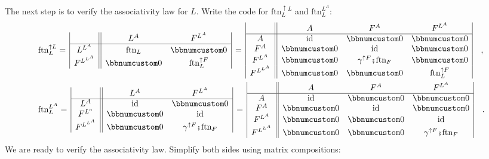 The next step is to verify the associativity law for $L$. Write the
code for $\text{ftn}_{L}^{\uparrow L}$ and $\text{ftn}_{L}^{L^{A}}$:
\begin{align*}
 & \text{ftn}_{L}^{\uparrow L}=\,\begin{array}{|c||cc|}
 & L^{A} & F^{L^{A}}\\
\hline L^{L^{A}} & \text{ftn}_{L} & \bbnum 0\\
F^{L^{L^{A}}} & \bbnum 0 & \text{ftn}_{L}^{\uparrow F}
\end{array}\,=\,\begin{array}{|c||ccc|}
 & A & F^{A} & F^{L^{A}}\\
\hline A & \text{id} & \bbnum 0 & \bbnum 0\\
F^{A} & \bbnum 0 & \text{id} & \bbnum 0\\
F^{L^{A}} & \bbnum 0 & \gamma^{\uparrow F}\bef\text{ftn}_{F} & \bbnum 0\\
F^{L^{L^{A}}} & \bbnum 0 & \bbnum 0 & \text{ftn}_{L}^{\uparrow F}
\end{array}\quad,\\
 & \text{ftn}_{L}^{L^{A}}=\,\begin{array}{|c||cc|}
 & L^{A} & F^{L^{A}}\\
\hline L^{A} & \text{id} & \bbnum 0\\
F^{L^{a}} & \bbnum 0 & \text{id}\\
F^{L^{L^{A}}} & \bbnum 0 & \gamma^{\uparrow F}\bef\text{ftn}_{F}
\end{array}\,=\,\begin{array}{|c||ccc|}
 & A & F^{A} & F^{L^{A}}\\
\hline A & \text{id} & \bbnum 0 & \bbnum 0\\
F^{A} & \bbnum 0 & \text{id} & \bbnum 0\\
F^{L^{A}} & \bbnum 0 & \bbnum 0 & \text{id}\\
F^{L^{L^{A}}} & \bbnum 0 & \bbnum 0 & \gamma^{\uparrow F}\bef\text{ftn}_{F}
\end{array}\quad.
\end{align*}
We are ready to verify the associativity law. Simplify both sides
using matrix compositions:
